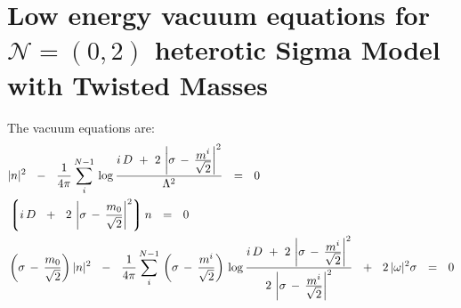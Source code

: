 \message{ !name(lowenergy_eqns.tex)}\documentclass{article}
\newcommand{\mc}[1]{\mathcal{#1}}
\newcommand{\lgr}{\left\lgroup}
\newcommand{\rgr}{\right\rgroup}
\begin{document}


\section*{Low energy vacuum equations for $\mc{N}=(0,2)$ heterotic Sigma Model with Twisted Masses}

	The vacuum equations are:
\begin{align*}
%
	&
	|n|^2  ~~-~~  \frac{1}{4\pi} \sum_i^{N-1}\, 
		{\rm log}\, 
		\frac{i\,D ~+~ 2\, \left| \sigma \,-\, \frac{\displaystyle m^i}{\displaystyle \sqrt{2}} \right|^2}
							{\Lambda^2}   ~~=~~ 0 \\				
%
	&
	\lgr i\, D ~~+~~ 2\,\left|\sigma \,-\, \frac{m_0}{\sqrt{2}}\right|^2 \rgr n ~~=~~ 0 \\
%
&
	\left(\sigma \,-\, \frac{m_0}{\sqrt{2}}\right)|n|^2 
		~~-~~ 
	\frac{1}{4\pi} \sum_i^{N-1}\,
			\left(\sigma \,-\, \frac{m^i}{\sqrt{2}}\right)\,
		{\rm log}\, 
		\frac{i\,D ~+~ 2\, \left| \sigma \,-\, \frac{\displaystyle m^i}{\displaystyle \sqrt{2}} \right|^2}
		{2\, \left| \sigma \,-\, \frac{\displaystyle m^i}{\displaystyle \sqrt{2}} \right|^2}
		~~+~~ 2\, |\omega|^2\sigma ~~=~~ 0
\end{align*}
\end{document}
